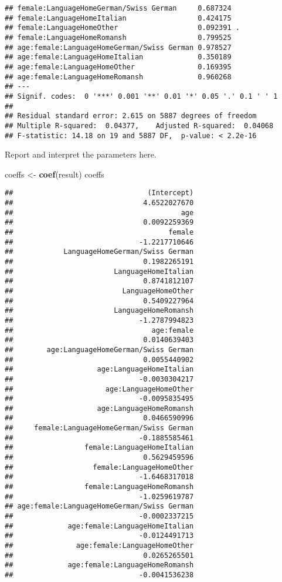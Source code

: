 \documentclass[
]{book}
\newenvironment{Shaded}{\begin{snugshade}}{\end{snugshade}}
\newcommand{\FunctionTok}[1]{\textcolor[rgb]{0.13,0.29,0.53}{\textbf{#1}}}
\newcommand{\NormalTok}[1]{#1}
\newcommand{\OtherTok}[1]{\textcolor[rgb]{0.56,0.35,0.01}{#1}}
\begin{document}
\begin{verbatim}
## female:LanguageHomeGerman/Swiss German     0.687324    
## female:LanguageHomeItalian                 0.424175    
## female:LanguageHomeOther                   0.092391 .  
## female:LanguageHomeRomansh                 0.799525    
## age:female:LanguageHomeGerman/Swiss German 0.978527    
## age:female:LanguageHomeItalian             0.350189    
## age:female:LanguageHomeOther               0.169395    
## age:female:LanguageHomeRomansh             0.960268    
## ---
## Signif. codes:  0 '***' 0.001 '**' 0.01 '*' 0.05 '.' 0.1 ' ' 1
## 
## Residual standard error: 2.615 on 5887 degrees of freedom
## Multiple R-squared:  0.04377,    Adjusted R-squared:  0.04068 
## F-statistic: 14.18 on 19 and 5887 DF,  p-value: < 2.2e-16
\end{verbatim}

Report and interpret the parameters here.

\begin{Shaded}
\begin{Highlighting}[]
\NormalTok{coeffs }\OtherTok{\textless{}{-}} \FunctionTok{coef}\NormalTok{(result)}
\NormalTok{coeffs}
\end{Highlighting}
\end{Shaded}

\begin{verbatim}
##                                (Intercept) 
##                               4.6522027670 
##                                        age 
##                               0.0092259369 
##                                     female 
##                              -1.2217710646 
##            LanguageHomeGerman/Swiss German 
##                               0.1982265191 
##                        LanguageHomeItalian 
##                               0.8741812107 
##                          LanguageHomeOther 
##                               0.5409227964 
##                        LanguageHomeRomansh 
##                              -1.2787994823 
##                                 age:female 
##                               0.0140639403 
##        age:LanguageHomeGerman/Swiss German 
##                               0.0055440902 
##                    age:LanguageHomeItalian 
##                              -0.0030304217 
##                      age:LanguageHomeOther 
##                              -0.0095835495 
##                    age:LanguageHomeRomansh 
##                               0.0466590996 
##     female:LanguageHomeGerman/Swiss German 
##                              -0.1885585461 
##                 female:LanguageHomeItalian 
##                               0.5629459596 
##                   female:LanguageHomeOther 
##                              -1.6468317018 
##                 female:LanguageHomeRomansh 
##                              -1.0259619787 
## age:female:LanguageHomeGerman/Swiss German 
##                              -0.0002337215 
##             age:female:LanguageHomeItalian 
##                              -0.0124491713 
##               age:female:LanguageHomeOther 
##                               0.0265265501 
##             age:female:LanguageHomeRomansh 
##                              -0.0041536238
\end{verbatim}
\end{document}
